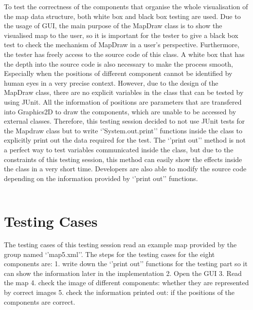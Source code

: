 \documentclass[11pt, a4paper]{article}
\begin{document}
To test the correctness of the components that organise the whole visualisation of the map data structure, both white box and black box testing are used. Due to the usage of GUI, the main purpose of the MapDraw class is to show the visualised map to the user, so it is important for the tester to give a black box test to check the mechanism of MapDraw in a user's perspective. Furthermore, the tester has freely access to the source code of this class. A white box that has the depth into the source code is also necessary to make the process smooth, Especially when the positions of different component cannot be identified by human eyes in a very precise context. However, due to the design of the MapDraw class, there are no explicit variables in the class that can be tested by using JUnit. All the information of positions are parameters that are transfered into Graphics2D to draw the components, which are unable to be accessed by external classes. Therefore, this testing session decided to not use JUnit tests for the Mapdraw class but to write `'System.out.print'' functions inside the class to explicitly print out the data required for the test. The `'print out'' method is not a perfect way to test variables communicated inside the class, but due to the constraints of this testing session, this method can easily show the effects inside the class in a very short time. Developers are also able to modify the source code depending on the information provided by `'print out'' functions. \\
\\
\section{Testing Cases}

The testing cases of this testing session read an example map provided by the group named `'map5.xml''. The steps for the testing cases for the eight components are: 1. write down the `'print out'' functions for the testing part so it can show the information later in the implementation 2. Open the GUI 3. Read the map 4. check the image of different components: whether they are represented by correct images 5. check the information printed out: if the positions of the components are correct. \\
\end{document}
